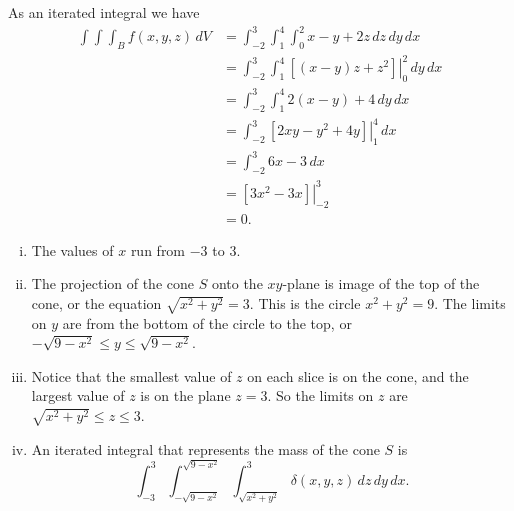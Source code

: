 \begin{smallhint}

\end{smallhint}
\begin{bighint}

\end{bighint}
\begin{activitySolution}
\ba
    
\item
As an iterated integral we have
\begin{align*}
\int \int \int_B f(x,y,z) \, dV &= \int_{-2}^3 \int_1^4 \int_0^2 x-y+2z \, dz \, dy \, dx \\
	&= \int_{-2}^3 \int_1^4 \left. \left[ (x-y)z+z^2\right] \right|_0^2 \, dy \, dx \\
	&= \int_{-2}^3 \int_1^4 2(x-y)+4 \, dy \, dx \\
	&= \int_{-2}^3 \left. \left[2xy-y^2+4y\right] \right|_1^4 \, dx \\
	&= \int_{-2}^3 6x-3 \, dx \\
	&= \left. \left[3x^2-3x\right] \right|_{-2}^3 \\
	&= 0.
\end{align*}

    
\item 
	\begin{enumerate}[i.]
	\item The values of $x$ run from $-3$ to $3$.

    \item The projection of the cone $S$ onto the $xy$-plane is image of the top of the cone, or the equation $\sqrt{x^2+y^2} = 3$. This is the circle $x^2+y^2 = 9$. The limits on $y$ are from the bottom of the circle to the top, or $-\sqrt{9-x^2} \leq y \leq \sqrt{9-x^2}$. 

	\item Notice that the smallest value of $z$ on each slice is on the cone, and the largest value of $z$ is on the plane $z=3$. So the limits on $z$ are $\sqrt{x^2+y^2} \leq z \leq 3$.
	
    \item An iterated integral that represents the mass of the cone $S$ is
\[  \int_{-3}^3 \int_{-\sqrt{9-x^2}}^{\sqrt{9-x^2}} \int_{\sqrt{x^2+y^2}}^{3} \delta(x,y,z) \, dz \, dy \, dx.\]
	\end{enumerate}
    \ea
\end{activitySolution}

\aftera
